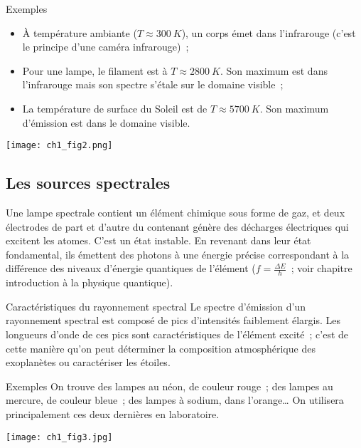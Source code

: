 \documentclass[../main/main.tex]{subfiles}
\begin{document}
\begin{NCexem}[sidebyside]{Exemples}
    \begin{itemize}
        \item À température ambiante ($T \approx \SI{300}{K}$), un corps émet
            dans l'infrarouge (c'est le principe d'une caméra infrarouge)~;
        \item Pour une lampe, le filament est à $T \approx \SI{2800}{K}$. Son
            maximum est dans l'infrarouge mais son spectre s'étale sur le
            domaine visible~;
        \item La température de surface du Soleil est de $T \approx
            \SI{5700}{K}$. Son maximum d'émission est dans le domaine visible.
    \end{itemize}
    \tcblower
    \begin{center}
        \texttt{[image: ch1\_fig2.png]}
        \label{fig:cps_chaud}
    \end{center}
\end{NCexem}

\subsection{Les sources spectrales}

Une lampe spectrale contient un élément chimique sous forme de gaz, et deux
électrodes de part et d'autre du contenant génère des décharges électriques qui
excitent les atomes. C'est un état instable. En revenant dans leur état
fondamental, ils émettent des photons à une énergie précise correspondant à la
différence des niveaux d'énergie quantiques de l'élément ($f = \frac{\Delta
E}{h}$~; voir chapitre introduction à la physique quantique).

\begin{NCdefi}[]{Caractéristiques du rayonnement spectral}
    Le spectre d'émission d'un rayonnement spectral est composé de pics
    d'intensités faiblement élargis. Les longueurs d'onde de ces pics sont
    caractéristiques de l'élément excité~; c'est de cette manière qu'on peut
    déterminer la composition atmosphérique des exoplanètes ou caractériser les
    étoiles.
\end{NCdefi}
\begin{NCexem}[sidebyside, righthand width=.5\linewidth]{Exemples}
    On trouve des lampes au néon, de couleur rouge~; des lampes au mercure, de
    couleur bleue~; des lampes à sodium, dans l'orange… On utilisera
    principalement ces deux dernières en laboratoire.
    \tcblower
    \begin{center}
        \texttt{[image: ch1\_fig3.jpg]}
        \label{fig:lamp_spec}
    \end{center}
\end{NCexem}
\end{document}
